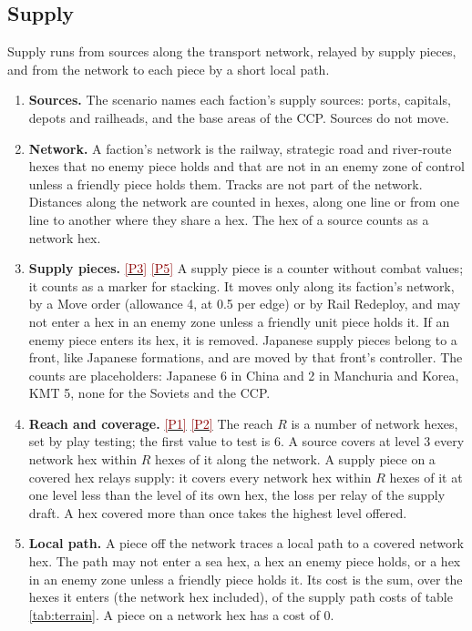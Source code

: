 \documentclass[11pt]{article}
\newcommand{\ptest}[1]{\hyperlink{ptest}{\textcolor{darkred}{[P#1]}}}
\begin{document}
\subsection{Supply}\label{sub:supply}
Supply runs from sources along the transport network, relayed by supply pieces, and from the network to each piece by a short local path.
\begin{enumerate}
\item \textbf{Sources.} The scenario names each faction's supply sources: ports, capitals, depots and railheads, and the base areas of the CCP. Sources do not move.
\item \textbf{Network.} A faction's network is the railway, strategic road and river-route hexes that no enemy piece holds and that are not in an enemy zone of control unless a friendly piece holds them. Tracks are not part of the network. Distances along the network are counted in hexes, along one line or from one line to another where they share a hex. The hex of a source counts as a network hex.
\item \textbf{Supply pieces.} \ptest{3} \ptest{5} A supply piece is a counter without combat values; it counts as a marker for stacking. It moves only along its faction's network, by a Move order (allowance 4, at 0.5 per edge) or by Rail Redeploy, and may not enter a hex in an enemy zone unless a friendly unit piece holds it. If an enemy piece enters its hex, it is removed. Japanese supply pieces belong to a front, like Japanese formations, and are moved by that front's controller. The counts are placeholders: Japanese 6 in China and 2 in Manchuria and Korea, KMT 5, none for the Soviets and the CCP.
\item \textbf{Reach and coverage.} \ptest{1} \ptest{2} The reach $R$ is a number of network hexes, set by play testing; the first value to test is 6. A source covers at level 3 every network hex within $R$ hexes of it along the network. A supply piece on a covered hex relays supply: it covers every network hex within $R$ hexes of it at one level less than the level of its own hex, the loss per relay of the supply draft. A hex covered more than once takes the highest level offered.
\item \textbf{Local path.} A piece off the network traces a local path to a covered network hex. The path may not enter a sea hex, a hex an enemy piece holds, or a hex in an enemy zone unless a friendly piece holds it. Its cost is the sum, over the hexes it enters (the network hex included), of the supply path costs of table \ref{tab:terrain}. A piece on a network hex has a cost of 0.

\end{enumerate}
\end{document}
